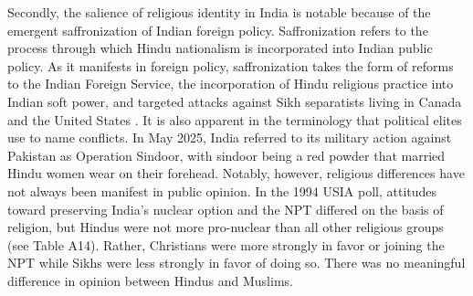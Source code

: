 \documentclass[12pt]{article}
\begin{document}
Secondly, the salience of religious identity in India is notable because of the emergent saffronization of Indian foreign policy. Saffronization refers to the process through which Hindu nationalism is incorporated into Indian public policy. As it manifests in foreign policy, saffronization takes the form of reforms to the Indian Foreign Service, the incorporation of Hindu religious practice into Indian soft power, and targeted attacks against Sikh separatists living in Canada and the United States \citep{huju_saffronizing_2022, mukherjee_hindu_2024}. It is also apparent in the terminology that political elites use to name conflicts. In May 2025, India referred to its military action against Pakistan as Operation Sindoor, with sindoor being a red powder that married Hindu women wear on their forehead. Notably, however, religious differences have not always been manifest in public opinion. In the 1994 USIA poll, attitudes toward preserving India's nuclear option and the NPT differed on the basis of religion, but Hindus were not more pro-nuclear than all other religious groups (see Table A14). Rather, Christians were more strongly in favor or joining the NPT while Sikhs were less strongly in favor of doing so. There was no meaningful difference in opinion between Hindus and Muslims.
\end{document}
